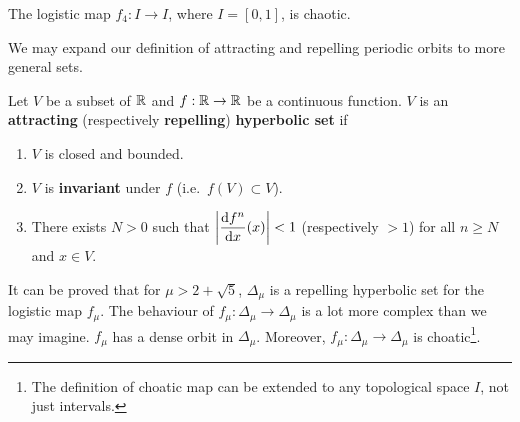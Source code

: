 \begin{egg}
The logistic map $f_4:I \to I$, where $I=[0,1]$, is chaotic. 
\end{egg}

We may expand our definition of attracting and repelling periodic
orbits to more general sets.

\begin{defn}
Let $V$ be a subset of $\mathbb{R}$ and $f:\mathbb{R}\rightarrow \mathbb{R}$ be a
continuous function.  $V$ is an
{\bfseries attracting}
(respectively {\bfseries repelling})
{\bfseries hyperbolic set} if
\begin{enumerate}
\item $V$ is closed and bounded.
\item $V$ is {\bfseries invariant} under $f$
(i.e.\ $f(V) \subset V$).
\item There exists $N>0$ such that
$\displaystyle \left| \frac{\mathrm{d}f^n}{\mathrm{d}{x}}(x)  \right| < 1$
(respectively $>1$) for all $n \geq N$ and $x \in V$.
\end{enumerate}
\end{defn}

\begin{egg}
It can be proved that for $\mu>2+\sqrt{5}$, $\Delta_\mu$ is a repelling
hyperbolic set for the logistic map $f_\mu$.  The behaviour of
$f_\mu:\Delta_\mu \to \Delta_\mu$ is a lot more complex than we may
imagine.  $f_\mu$ has a dense orbit in $\Delta_\mu$.  Moreover,
$f_\mu:\Delta_\mu \to \Delta_\mu$ is choatic\footnote{The definition
of choatic map can be extended to any topological space $I$, not just
intervals.}.
\end{egg}

